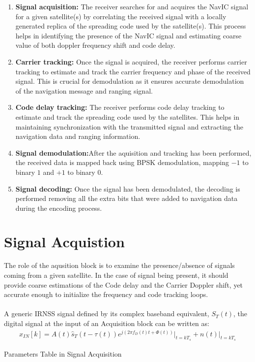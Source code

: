 \begin{enumerate}
	\item \textbf{Signal acquisition:} The receiver searches for and acquires the NavIC signal for a given satellite(s) by correlating the received signal with a locally generated replica of the spreading code used by the satellite(s). This process helps in identifying the presence of the NavIC signal and estimating coarse value of both doppler frequency shift and code delay.
\item \textbf{Carrier tracking:} Once the signal is acquired, the receiver performs carrier tracking to estimate and track the carrier frequency and phase of the received signal. This is crucial for demodulation as it ensures accurate demodulation of the navigation message and ranging signal.
\item \textbf{Code delay tracking:} The receiver performs code delay tracking to estimate and track the spreading code used by the satellites. This helps in maintaining synchronization with the transmitted signal and extracting the navigation data and ranging information.
\item \textbf{Signal demodulation:}After the aquisition and tracking has been performed, the received data is mapped back using BPSK demodulation, mapping $-1$ to binary $1$ and $+1$ to binary $0$.
\item \textbf{Signal decoding:} Once the signal has been demodulated, the decoding is performed removing all the extra bits that were added to navigation data during the encoding process.
\end{enumerate}

\section{Signal Acquistion}
The role of the aqusition block is to examine the presence/absence of signals coming from a given satellite. In the case of signal being present, it should provide coarse estimations of the Code delay and the Carrier Doppler shift, yet accurate enough to initialize the frequency and code tracking loops.
\\
\\
A generic IRNSS signal defined by its complex baseband equivalent, 
$S_T(t)$, the digital signal at the input of an Acquisition block can be written as:
\begin{align}
	x_{IN}[k]=A(t)\hat s_T (t-\tau(t))e^{j(2 \pi f_D(t)t+\Phi(t))}\bigg|_{t=kT_s} +n(t)\bigg|_{t=kT_s}
\end{align}
\begin{table}[h]

\vspace{3mm}
\caption{Parameters Table in Signal Acquisition}
\label{table:table_para}
\end{table}

